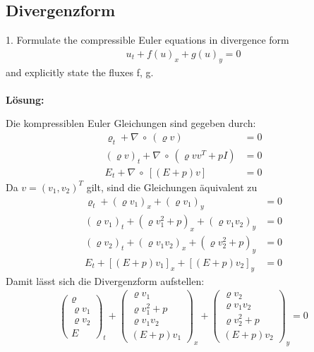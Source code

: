 \documentclass[11pt]{scrartcl}
\begin{document}
\subsection{Divergenzform}

1. Formulate the compressible Euler equations in divergence form 
\begin{align*}
	u_t+f(u)_x + g(u)_y =0 
\end{align*}
and explicitly state the fluxes f, g.
\\
\\
\textbf{Lösung:}

Die kompressiblen Euler Gleichungen sind gegeben durch:
\begin{align*}
	\varrho_t+ \nabla \  \circ \ (\varrho v)&=0\\
	(\varrho v)_t+ \nabla \  \circ \ (\varrho vv^T + pI)&=0\\
	E_t + \nabla \ \circ \ [(E+p)v]&=0
\end{align*}
Da $v=(v_1,v_2)^T$ gilt, sind die Gleichungen äquivalent zu
\begin{align*}
	\varrho_t+ (\varrho v_1)_x + (\varrho v_1)_y  &=0\\
	(\varrho v_1)_t+ (\varrho v_1^2 + p)_x + (\varrho v_1 v_2)_y &=0\\
	(\varrho v_2)_t+ (\varrho v_1 v_2 )_x + (\varrho v_2^2 + p)_y &=0\\
	E_t + [(E+p)v_1]_x + [(E+p)v_2]_y&=0
\end{align*}
Damit lässt sich die Divergenzform aufstellen:
\begin{align*}
	\left(\begin{array}{c} \varrho \\ \varrho v_1 \\ \varrho v_2 \\ E \end{array}\right)_t	+  \left(\begin{array}{c} \varrho v_1 \\ \varrho v_1^2 + p \\ \varrho v_1 v_2 \\ (E+p)v_1 \end{array}\right)_x +  \left(\begin{array}{c} \varrho v_2 \\ \varrho v_1 v_2 \\ \varrho v_2^2+p \\ (E+p)v_2 \end{array}\right)_y = 0
\end{align*}
\end{document}
